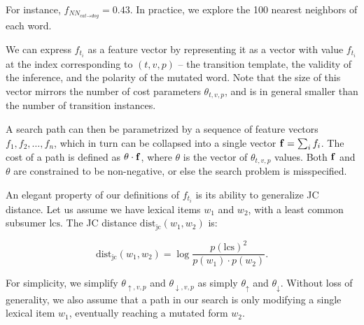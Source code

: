 For instance, $f_{NN_{\textit{cat} \rightarrow \textit{dog}}} = 0.43$.
In practice, we explore the 100 nearest neighbors of each word.

We can express $f_{t_i}$ as a feature vector by representing it as
  a vector with value $f_{t_i}$ at the index corresponding to
  $(t,v,p)$ -- the transition template, the validity of the inference,
  and the polarity of the mutated word.
Note that the size of this vector mirrors the number of cost
  parameters $\theta_{t,v,p}$, and is in general smaller than the
  number of transition instances.

A search path can then be parametrized by a sequence of feature vectors
  $f_1, f_2, \dots, f_n$, which in turn can be collapsed into a single
  vector $\mathbf{f} = \sum_i f_i$.
The cost of a path is defined as $\theta \cdot \mathbf{f}$, where
  $\theta$ is the vector of $\theta_{t,v,p}$ values.
Both $\mathbf{f}$ and $\theta$ are constrained to be non-negative, or else
  the search problem is misspecified.


%
%
An elegant property of our definitions of $f_{t_i}$ is its ability to
  generalize JC distance.
Let us assume we have lexical items $w_1$ and $w_2$, with a least common 
  subsumer $\textrm{lcs}$.
The JC distance $\textrm{dist}_{\textrm{jc}}(w_1, w_2)$ is:

\vspace{0.25cm}
\begin{equation}
\textrm{dist}_{\textrm{jc}}(w_1, w_2)
  = \log\frac{p(\textrm{lcs})^2}{p(w_1) \cdot p(w_2)}.
\label{eqn:jc}
\end{equation}
\vspace{0.25cm}

For simplicity, we simplify $\theta_{\uparrow,v,p}$ and $\theta_{\downarrow,v,p}$
  as simply $\theta_\uparrow$ and $\theta_\downarrow$.
Without loss of generality, we also assume that a path in our search
  is only modifying a single lexical item $w_1$, eventually 
  reaching a mutated form $w_2$.

